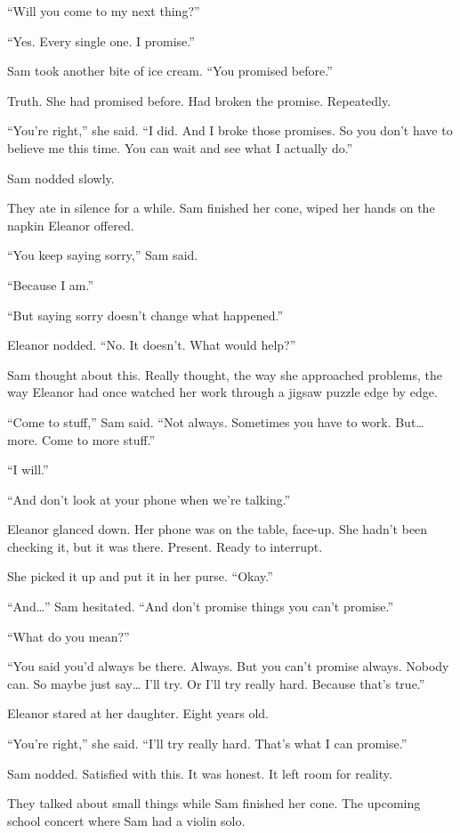 ``Will you come to my next thing?''

``Yes. Every single one. I promise.''

Sam took another bite of ice cream. ``You promised before.''

Truth. She had promised before. Had broken the promise. Repeatedly.

``You're right,'' she said. ``I did. And I broke those promises. So you don't have to believe me this time. You can wait and see what I actually do.''

Sam nodded slowly.

They ate in silence for a while. Sam finished her cone, wiped her hands on the napkin Eleanor offered.

``You keep saying sorry,'' Sam said.

``Because I am.''

``But saying sorry doesn't change what happened.''

Eleanor nodded. ``No. It doesn't. What would help?''

Sam thought about this. Really thought, the way she approached problems, the way Eleanor had once watched her work through a jigsaw puzzle edge by edge.

``Come to stuff,'' Sam said. ``Not always. Sometimes you have to work. But\ldots{} more. Come to more stuff.''

``I will.''

``And don't look at your phone when we're talking.''

Eleanor glanced down. Her phone was on the table, face-up. She hadn't been checking it, but it was there. Present. Ready to interrupt.

She picked it up and put it in her purse. ``Okay.''

``And\ldots{}'' Sam hesitated. ``And don't promise things you can't promise.''

``What do you mean?''

``You said you'd always be there. Always. But you can't promise always. Nobody can. So maybe just say\ldots{} I'll try. Or I'll try really hard. Because that's true.''

Eleanor stared at her daughter. Eight years old.

``You're right,'' she said. ``I'll try really hard. That's what I can promise.''

Sam nodded. Satisfied with this. It was honest. It left room for reality.

They talked about small things while Sam finished her cone. The upcoming school concert where Sam had a violin solo.

